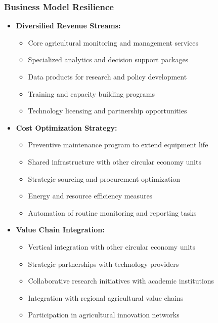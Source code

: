 \subsubsection{Business Model Resilience}
\begin{itemize}
    \item \textbf{Diversified Revenue Streams:}
    \begin{itemize}
        \item Core agricultural monitoring and management services
        \item Specialized analytics and decision support packages
        \item Data products for research and policy development
        \item Training and capacity building programs
        \item Technology licensing and partnership opportunities
    \end{itemize}
    
    \item \textbf{Cost Optimization Strategy:}
    \begin{itemize}
        \item Preventive maintenance program to extend equipment life
        \item Shared infrastructure with other circular economy units
        \item Strategic sourcing and procurement optimization
        \item Energy and resource efficiency measures
        \item Automation of routine monitoring and reporting tasks
    \end{itemize}
    
    \item \textbf{Value Chain Integration:}
    \begin{itemize}
        \item Vertical integration with other circular economy units
        \item Strategic partnerships with technology providers
        \item Collaborative research initiatives with academic institutions
        \item Integration with regional agricultural value chains
        \item Participation in agricultural innovation networks
    \end{itemize}
\end{itemize}

